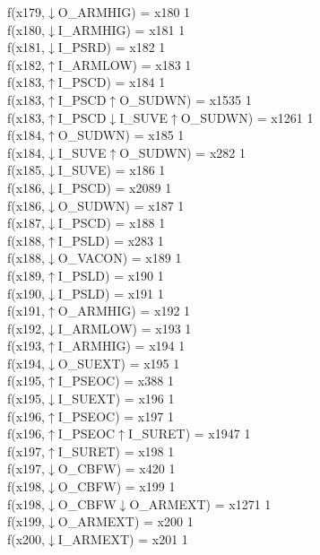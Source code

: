 f(x179,$\downarrow$O\_ARMHIG) = x180 {1} \\
f(x180,$\downarrow$I\_ARMHIG) = x181 {1} \\
f(x181,$\downarrow$I\_PSRD) = x182 {1} \\
f(x182,$\uparrow$I\_ARMLOW) = x183 {1} \\
f(x183,$\uparrow$I\_PSCD) = x184 {1} \\
f(x183,$\uparrow$I\_PSCD$\uparrow$O\_SUDWN) = x1535 {1} \\
f(x183,$\uparrow$I\_PSCD$\downarrow$I\_SUVE$\uparrow$O\_SUDWN) = x1261 {1} \\
f(x184,$\uparrow$O\_SUDWN) = x185 {1} \\
f(x184,$\downarrow$I\_SUVE$\uparrow$O\_SUDWN) = x282 {1} \\
f(x185,$\downarrow$I\_SUVE) = x186 {1} \\
f(x186,$\downarrow$I\_PSCD) = x2089 {1} \\
f(x186,$\downarrow$O\_SUDWN) = x187 {1} \\
f(x187,$\downarrow$I\_PSCD) = x188 {1} \\
f(x188,$\uparrow$I\_PSLD) = x283 {1} \\
f(x188,$\downarrow$O\_VACON) = x189 {1} \\
f(x189,$\uparrow$I\_PSLD) = x190 {1} \\
f(x190,$\downarrow$I\_PSLD) = x191 {1} \\
f(x191,$\uparrow$O\_ARMHIG) = x192 {1} \\
f(x192,$\downarrow$I\_ARMLOW) = x193 {1} \\
f(x193,$\uparrow$I\_ARMHIG) = x194 {1} \\
f(x194,$\downarrow$O\_SUEXT) = x195 {1} \\
f(x195,$\uparrow$I\_PSEOC) = x388 {1} \\
f(x195,$\downarrow$I\_SUEXT) = x196 {1} \\
f(x196,$\uparrow$I\_PSEOC) = x197 {1} \\
f(x196,$\uparrow$I\_PSEOC$\uparrow$I\_SURET) = x1947 {1} \\
f(x197,$\uparrow$I\_SURET) = x198 {1} \\
f(x197,$\downarrow$O\_CBFW) = x420 {1} \\
f(x198,$\downarrow$O\_CBFW) = x199 {1} \\
f(x198,$\downarrow$O\_CBFW$\downarrow$O\_ARMEXT) = x1271 {1} \\
f(x199,$\downarrow$O\_ARMEXT) = x200 {1} \\
f(x200,$\downarrow$I\_ARMEXT) = x201 {1} \\
